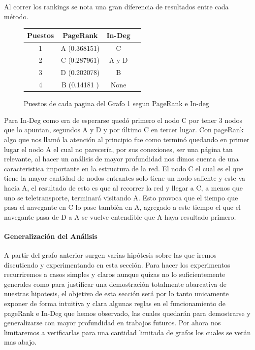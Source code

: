 Al correr los rankings se nota una gran diferencia de resultados entre cada método.

\begin{figure}[H]
\centering
\begin{tabular}{| c | c | c | c |}
  \hline
  Puestos & PageRank & In-Deg \\ \hline \hline
  1 & A (0.368151) & C \\ \hline
  2 & C (0.287961) & A y D \\ \hline
  3 & D (0.202078) & B\\ \hline
  4 & B (0.14181 ) & None \\ \hline
\end{tabular}

  \caption{\footnotesize{Puestos de cada pagina del Grafo 1 segun PageRank e In-deg}}
  \label{fig:Rankings}
\end{figure}

Para In-Deg como era de esperarse quedó primero el nodo C por tener 3 nodos que lo apuntan, segundos A y D y por último C en tercer lugar. Con pageRank algo que nos llamó la atención al principio fue como terminó quedando en primer lugar el nodo A el cual no parecería, por sus conexiones, ser una página tan relevante, al hacer un análisis de mayor profundidad nos dimos cuenta de una caracteristica importante en la estructura de la red. El nodo C el cual es el que tiene la mayor cantidad de nodos entrantes solo tiene un nodo saliente y este va hacia A, el resultado de esto es que al recorrer la red y llegar a C, a menos que uno se teletransporte, terminará visitando A. Esto provoca que el tiempo que pasa el navegante en C lo pase también en A, agregado a este tiempo el que el navegante pasa de D a A se vuelve entendible que A haya resultado primero.

\paragraph{Generalización del Análisis}

A partir del grafo anterior surgen varias hipótesis sobre las que iremos discutiendo y experimentando en esta sección. Para hacer los experimentos recurriremos a casos simples y claros aunque quizas no lo suficientemente generales como para justificar una demostración totalmente abarcativa de nuestras hipotesis, el objetivo de esta sección será por lo tanto unicamente exponer de forma intuitiva y clara algunas reglas en el funcionamiento de pageRank e In-Deg que hemos observado, las cuales quedarán para demostrarse y generalizarse con mayor profundidad en trabajos futuros. Por ahora nos limitaremos a verificarlas para una cantidad limitada de grafos los cuales se verán mas abajo.

